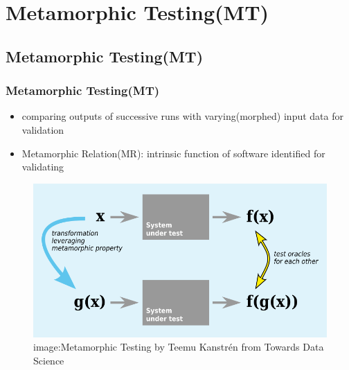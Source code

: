 
\section{Metamorphic Testing(MT)}
\subsection{Metamorphic Testing(MT)}


\begin{frame}[fragile]
	\frametitle{Metamorphic Testing(MT)}
	\begin{itemize}
		\item comparing outputs of successive runs with varying(morphed) input data for validation
		\item Metamorphic Relation(MR): intrinsic function of software identified for validating
	\end{itemize}	

			\begin{figure}
				 \includegraphics[scale = 0.22]{images/Metamorphic_Testing_image}
				\linebreak
			 	\tiny{image:Metamorphic Testing by Teemu Kanstr\'{e}n from Towards Data Science}
			\end{figure}
		
	
\end{frame}


